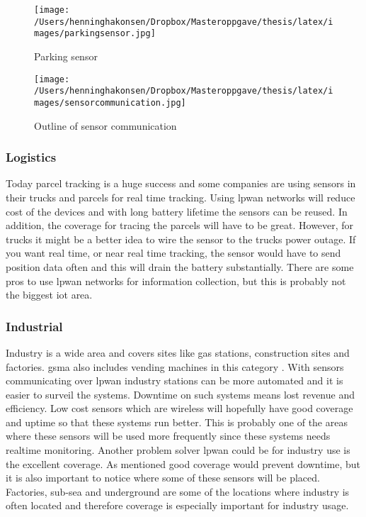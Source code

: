 \documentclass[USenglish]{ifimaster}  %
\begin{document}
\begin{figure}[H]
  \centering\texttt{[image: /Users/henninghakonsen/Dropbox/Masteroppgave/thesis/latex/images/parkingsensor.jpg]}
  \caption[Parking sensor]{Parking sensor \cite{person:ola}}
  \label{pic:parkingsensor}
\end{figure}

\begin{figure}[H]
  \centering\texttt{[image: /Users/henninghakonsen/Dropbox/Masteroppgave/thesis/latex/images/sensorcommunication.jpg]}
  \caption[Outline of sensor communication]{Outline of sensor communication \cite{person:ola}}
  \label{pic:sensorcommunication}
\end{figure}

\subsubsection{Logistics}
Today parcel tracking is a huge success and some companies are using sensors in their trucks and parcels for real time tracking. Using \acrshort{lpwan} networks will reduce cost of the devices and with long battery lifetime the sensors can be reused. In addition, the coverage for tracing the parcels will have to be great. However, for trucks it might be a better idea to wire the sensor to the trucks power outage. If you want real time, or near real time tracking, the sensor would have to send position data often and this will drain the battery substantially. There are some pros to use \acrshort{lpwan} networks for information collection, but this is probably not the biggest \acrshort{iot} area.

\subsubsection{Industrial}
Industry is a wide area and covers sites like gas stations, construction sites and factories. \acrshort{gsma} also includes vending machines in this category \cite{online:lpwaFuture}. With sensors communicating over \acrshort{lpwan} industry stations can be more automated and it is easier to surveil the systems. Downtime on such systems means lost revenue and efficiency. Low cost sensors which are wireless will hopefully have good coverage and uptime so that these systems run better. This is probably one of the areas where these sensors will be used more frequently since these systems needs realtime monitoring. Another problem solver \acrshort{lpwan} could be for industry use is the excellent coverage. As mentioned good coverage would prevent downtime, but it is also important to notice where some of these sensors will be placed. Factories, sub-sea and underground are some of the locations where industry is often located and therefore coverage is especially important for industry usage.
\end{document}
